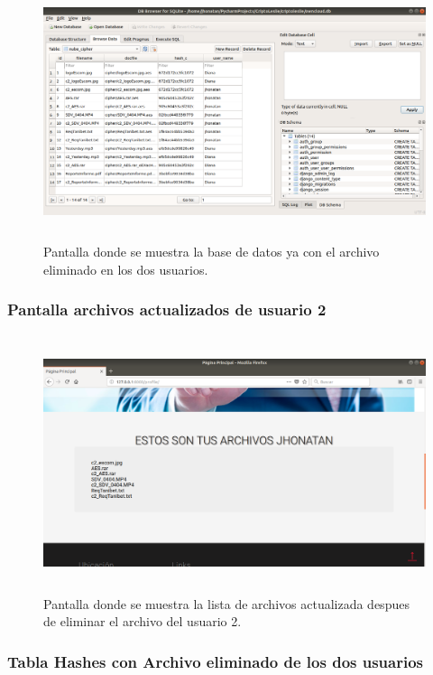 			\begin{figure}[H]
			\centering
			\includegraphics[width=14cm, height=7.5cm]{./images/Implementacion/TablaCipherArchivoEliminado2.png}
			\caption{Pantalla donde se muestra la base de datos ya con el archivo eliminado en los dos usuarios.}
			\label{fig:6-1-40} 
			\end{figure}

\subsubsection{Pantalla archivos actualizados de usuario 2}

			\begin{figure}[H]
			\centering
			\includegraphics[width=14cm, height=7.5cm]{./images/Implementacion/ArchivoEliminado2.png}
			\caption{Pantalla donde se muestra la lista de archivos actualizada despues de eliminar el archivo del usuario 2.}
			\label{fig:6-1-41} 
			\end{figure}

\subsubsection{Tabla Hashes con Archivo eliminado de los dos usuarios}

